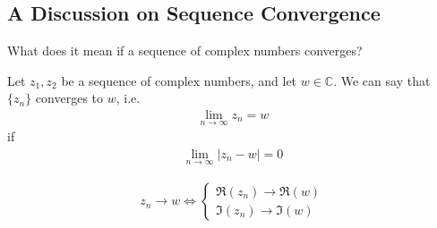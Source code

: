 \subsection{A Discussion on Sequence Convergence}
What does it mean if a sequence of complex numbers converges?
\begin{definition}
    Let $z_1, z_2$ be a sequence of complex numbers, and let $w \in \mathbb{C}$. We can say that $\{ z_n \}$ converges to $w$, i.e.
    \begin{align}
        \lim_{n \to \infty}{z_n} = w
    \end{align}
    if
    \begin{align}
        \lim_{n \to \infty}{|z_n - w|} = 0
    \end{align}
\end{definition}
\begin{lemma}
\begin{align}
    z_n \to w \iff
    \begin{cases}
        \Re(z_n) \to \Re(w)\\
        \Im(z_n) \to \Im(w)
    \end{cases}
\end{align}
\end{lemma}
